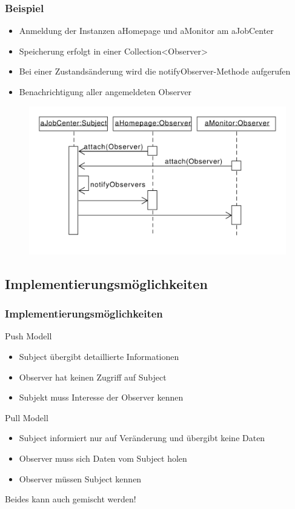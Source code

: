 \begin{frame}
	\frametitle{Beispiel}
	\begin{itemize}
		\item Anmeldung der Instanzen aHomepage und aMonitor am aJobCenter 
		\item Speicherung erfolgt in einer Collection<Observer>
		\item Bei einer Zustandsänderung wird die notifyObserver-Methode aufgerufen
		\item Benachrichtigung aller angemeldeten Observer
	\end{itemize}		 
  	\begin{figure}
		\includegraphics[scale=.4]{paper/observer/observer_sequenz}
	\end{figure}
\end{frame}


\subsection{Implementierungsmöglichkeiten}
\begin{frame}
\frametitle{Implementierungsmöglichkeiten}
		\begin{block}{Push Modell}
		  \begin{itemize}
		  	\item Subject übergibt detaillierte Informationen 
		  	\item Observer hat keinen Zugriff auf Subject
		  	\item Subjekt muss Interesse der Observer kennen
		  \end{itemize}
  		\end{block}
  		\begin{block}{Pull Modell}
  		 \begin{itemize}
		  	\item Subject informiert nur auf Veränderung und übergibt keine Daten
		  	\item Observer muss sich Daten vom Subject holen
		  	\item Observer müssen Subject kennen
		  \end{itemize}  
  		\end{block}
  		Beides kann auch gemischt werden!
\end{frame}

